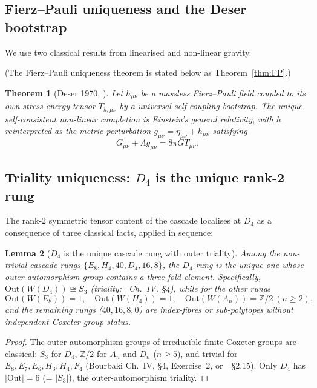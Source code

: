 \documentclass[12pt]{article}
\newtheorem{theorem}{Theorem}
\newtheorem{lemma}[theorem]{Lemma}
\theoremstyle{definition}
\theoremstyle{remark}
\begin{document}
\subsection{Fierz--Pauli uniqueness and the Deser bootstrap}

We use two classical results from linearised and non-linear gravity.

(The Fierz--Pauli uniqueness theorem is stated below as Theorem~\ref{thm:FP}.)

\begin{theorem}[Deser 1970, \citep{Deser1970}]\label{thm:deser}
Let $h_{\mu\nu}$ be a massless Fierz--Pauli field coupled to its own stress-energy tensor $T_{h, \mu\nu}$ by a universal self-coupling bootstrap. The unique self-consistent non-linear completion is Einstein's general relativity, with $h$ reinterpreted as the metric perturbation $g_{\mu\nu} = \eta_{\mu\nu} + h_{\mu\nu}$ satisfying
\begin{equation}\label{eq:einstein-lambda}
G_{\mu\nu} + \Lambda g_{\mu\nu} = 8\pi G T_{\mu\nu}.
\end{equation}
\end{theorem}

\subsection{Triality uniqueness: $D_4$ is the unique rank-2 rung}

The rank-$2$ symmetric tensor content of the cascade localises at $D_4$ as a consequence of three classical facts, applied in sequence:

\begin{lemma}[$D_4$ is the unique cascade rung with outer triality]\label{lem:triality-unique}
Among the non-trivial cascade rungs $\{E_8, H_4, 40, D_4, 16, 8\}$, the $D_4$ rung is the unique one whose outer automorphism group contains a three-fold element. Specifically, $\mathrm{Out}(W(D_4)) \cong S_3$ (triality;~\citep{Bourbaki2002} Ch.~IV, \S4), while for the other rungs
\begin{equation}
\mathrm{Out}(W(E_8)) = 1, \quad \mathrm{Out}(W(H_4)) = 1, \quad \mathrm{Out}(W(A_n)) = \mathbb{Z}/2 \ (n \ge 2),
\end{equation}
and the remaining rungs ($40, 16, 8, 0$) are index-fibres or sub-polytopes without independent Coxeter-group status.
\end{lemma}

\begin{proof}
The outer automorphism groups of irreducible finite Coxeter groups are classical: $S_3$ for $D_4$, $\mathbb{Z}/2$ for $A_n$ and $D_n$ ($n \ge 5$), and trivial for $E_8, E_7, E_6, H_3, H_4, F_4$ (Bourbaki Ch.~IV, \S4, Exercise~2, or~\citep{Humphreys1990}~\S2.15). Only $D_4$ has $|\mathrm{Out}| = 6$ (= $|S_3|$), the outer-automorphism triality.
\end{proof}
\end{document}

